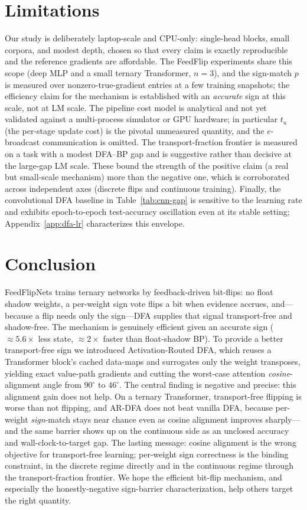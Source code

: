 \documentclass[11pt]{article}
\newcommand{\ARDFA}{\textsc{AR-DFA}}
\begin{document}
\section{Limitations}\label{sec:limits}
Our study is deliberately laptop-scale and CPU-only: single-head blocks, small corpora, and modest depth, chosen so that every claim is exactly reproducible and the reference gradients are affordable. The FeedFlip experiments share this scope (deep MLP and a small ternary Transformer, $n{=}3$), and the sign-match $p$ is measured over nonzero-true-gradient entries at a few training snapshots; the efficiency claim for the mechanism is established with an \emph{accurate} sign at this scale, not at LM scale. The pipeline cost model is analytical and not yet validated against a multi-process simulator or GPU hardware; in particular $t_u$ (the per-stage update cost) is the pivotal unmeasured quantity, and the $e$-broadcast communication is omitted. The transport-fraction frontier is measured on a task with a modest DFA--BP gap and is suggestive rather than decisive at the large-gap LM scale. These bound the strength of the positive claim (a real but small-scale mechanism) more than the negative one, which is corroborated across independent axes (discrete flips and continuous training). Finally, the convolutional DFA baseline in Table~\ref{tab:cnn-gap} is sensitive to the learning rate and exhibits epoch-to-epoch test-accuracy oscillation even at its stable setting; Appendix~\ref{app:dfa-lr} characterizes this envelope.

\section{Conclusion}\label{sec:conclusion}
FeedFlipNets trains ternary networks by feedback-driven bit-flips: no float shadow weights, a per-weight sign vote flips a bit when evidence accrues, and---because a flip needs only the sign---DFA supplies that signal transport-free and shadow-free. The mechanism is genuinely efficient given an accurate sign ($\approx\!5.6\times$ less state, $\approx\!2\times$ faster than float-shadow BP). To provide a better transport-free sign we introduced Activation-Routed DFA, which reuses a Transformer block's cached data-maps and surrogates only the weight transposes, yielding exact value-path gradients and cutting the worst-case attention \emph{cosine}-alignment angle from $90^{\circ}$ to $46^{\circ}$. The central finding is negative and precise: this alignment gain does not help. On a ternary Transformer, transport-free flipping is worse than not flipping, and \ARDFA{} does not beat vanilla DFA, because per-weight \emph{sign}-match stays near chance even as cosine alignment improves sharply---and the same barrier shows up on the continuous side as an unclosed accuracy and wall-clock-to-target gap. The lasting message: cosine alignment is the wrong objective for transport-free learning; per-weight sign correctness is the binding constraint, in the discrete regime directly and in the continuous regime through the transport-fraction frontier. We hope the efficient bit-flip mechanism, and especially the honestly-negative sign-barrier characterization, help others target the right quantity.
\end{document}
